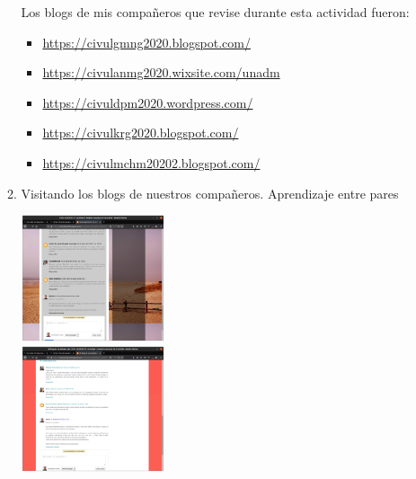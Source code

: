 \documentclass[12pt]{article}
\begin{document}
\begin{enumerate}[{\bf Sesi\'on} 1{.}]
\begin{enumerate}[{\bf Actividad} 1{.}]
					\par Los blogs de mis compa\~neros que revise durante esta actividad fueron:
						\begin{itemize}
							\item \url {https://civulgmng2020.blogspot.com/}
							\item \url {https://civulanmg2020.wixsite.com/unadm}
							\item \url {https://civuldpm2020.wordpress.com/}
							\item \url {https://civulkrg2020.blogspot.com/}
							\item \url {https://civulmchm20202.blogspot.com/}
						\end{itemize}		
							
				\item {Visitando los blogs de nuestros compañeros. Aprendizaje entre pares}
					\begin{multicols}{2}			
						\includegraphics[width=0.35\textwidth] {CIVUL-U1-S2-A3-1-1}\\
						\includegraphics[width=0.35\textwidth] {CIVUL-U1-S2-A3-1-2}
					\end{multicols}
					

\end{enumerate}
\end{enumerate}
\end{document}
